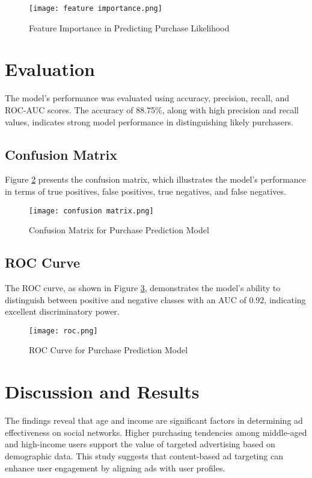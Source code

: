 \documentclass[12pt]{article}
\begin{document}
\begin{figure}[H]
    \centering
    \texttt{[image: feature importance.png]}
    \caption{Feature Importance in Predicting Purchase Likelihood}
    \label{fig:feature_importance}
\end{figure}

\section{Evaluation}
The model's performance was evaluated using accuracy, precision, recall, and ROC-AUC scores. The accuracy of 88.75\%, along with high precision and recall values, indicates strong model performance in distinguishing likely purchasers.

\subsection{Confusion Matrix}
Figure \ref{fig:confusion_matrix} presents the confusion matrix, which illustrates the model's performance in terms of true positives, false positives, true negatives, and false negatives.

\begin{figure}[H]
    \centering
    \texttt{[image: confusion matrix.png]}
    \caption{Confusion Matrix for Purchase Prediction Model}
    \label{fig:confusion_matrix}
\end{figure}

\subsection{ROC Curve}
The ROC curve, as shown in Figure \ref{fig:roc_curve}, demonstrates the model's ability to distinguish between positive and negative classes with an AUC of 0.92, indicating excellent discriminatory power.

\begin{figure}[H]
    \centering
    \texttt{[image: roc.png]}
    \caption{ROC Curve for Purchase Prediction Model}
    \label{fig:roc_curve}
\end{figure}

\section{Discussion and Results}
The findings reveal that age and income are significant factors in determining ad effectiveness on social networks. Higher purchasing tendencies among middle-aged and high-income users support the value of targeted advertising based on demographic data. This study suggests that content-based ad targeting can enhance user engagement by aligning ads with user profiles.
\end{document}
